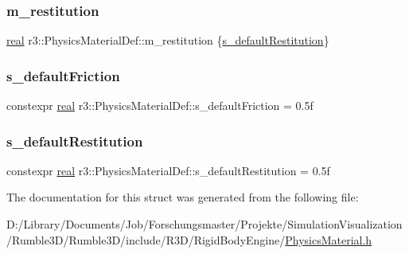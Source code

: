 \subsubsection{\texorpdfstring{m\+\_\+restitution}{m\_restitution}}
{\footnotesize\ttfamily \mbox{\hyperlink{namespacer3_ab2016b3e3f743fb735afce242f0dc1eb}{real}} r3\+::\+Physics\+Material\+Def\+::m\+\_\+restitution \{\mbox{\hyperlink{structr3_1_1_physics_material_def_a994308068cb88f266dd5f9f63f320add}{s\+\_\+default\+Restitution}}\}}

\mbox{\label{structr3_1_1_physics_material_def_a491a5e29b693bd20a7a8708f13c7f473}} 
\subsubsection{\texorpdfstring{s\+\_\+default\+Friction}{s\_defaultFriction}}
{\footnotesize\ttfamily constexpr \mbox{\hyperlink{namespacer3_ab2016b3e3f743fb735afce242f0dc1eb}{real}} r3\+::\+Physics\+Material\+Def\+::s\+\_\+default\+Friction = 0.\+5f\hspace{0.3cm}{\ttfamily [static]}}

\mbox{\label{structr3_1_1_physics_material_def_a994308068cb88f266dd5f9f63f320add}} 
\subsubsection{\texorpdfstring{s\+\_\+default\+Restitution}{s\_defaultRestitution}}
{\footnotesize\ttfamily constexpr \mbox{\hyperlink{namespacer3_ab2016b3e3f743fb735afce242f0dc1eb}{real}} r3\+::\+Physics\+Material\+Def\+::s\+\_\+default\+Restitution = 0.\+5f\hspace{0.3cm}{\ttfamily [static]}}



The documentation for this struct was generated from the following file\+:\begin{DoxyCompactItemize}
\item 
D\+:/\+Library/\+Documents/\+Job/\+Forschungsmaster/\+Projekte/\+Simulation\+Visualization/\+Rumble3\+D/\+Rumble3\+D/include/\+R3\+D/\+Rigid\+Body\+Engine/\mbox{\hyperlink{_physics_material_8h}{Physics\+Material.\+h}}\end{DoxyCompactItemize}
